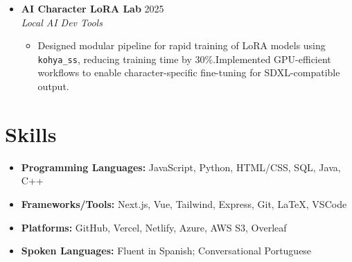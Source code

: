 \documentclass[letterpaper,10pt]{article}
\newcommand{\resumeItem}[2]{\item\small{#1}}
\begin{document}
\begin{itemize}[leftmargin=0in]
  \item[]
    \textbf{AI Character LoRA Lab} \hfill 2025 \\
    \textit{Local AI Dev Tools}
    \begin{itemize}
      \resumeItem{Designed modular pipeline for rapid training of LoRA models using \texttt{kohya\_ss}, reducing training time by 30\%.}
      \resumeItem{Implemented GPU-efficient workflows to enable character-specific fine-tuning for SDXL-compatible output.}
    \end{itemize}
\end{itemize}


\section*{Skills}
\begin{itemize}[leftmargin=0.15in, label={}]
  \item \textbf{Programming Languages:} JavaScript, Python, HTML/CSS, SQL, Java, C++
  \item \textbf{Frameworks/Tools:} Next.js, Vue, Tailwind, Express, Git, LaTeX, VSCode
  \item \textbf{Platforms:} GitHub, Vercel, Netlify, Azure, AWS S3, Overleaf
  \item \textbf{Spoken Languages:} Fluent in Spanish; Conversational Portuguese
\end{itemize}
\end{document}
